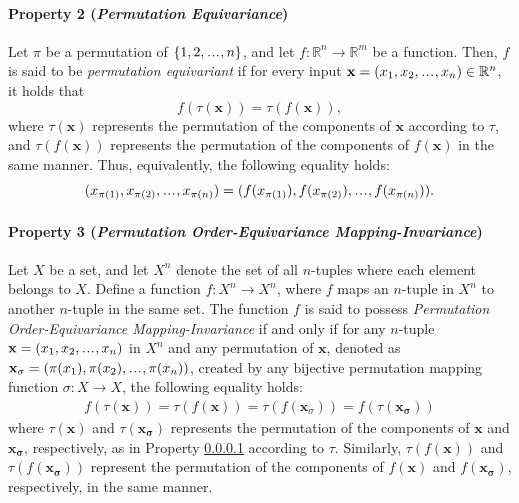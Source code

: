 \documentclass{article}
\newcommand{\poemi}{\emph{Permutation Order-Equivariance Mapping-Invariance}}
\newcommand{\permeq}{\emph{Permutation Equivariance}}
\newcommand\sdots{\makebox[1em][c]{.\hfil.\hfil.}}
\begin{document}
\paragraph{Property 2 (\permeq)}
\label{par:permutation_equivariance}
Let $\pi$ be a permutation of $\{1, 2, \sdots, n\}$, and let $f: \mathbb{R}^n \rightarrow \mathbb{R}^m$ be a function. Then, $f$ is said to be \emph{permutation equivariant}
if for every input $\mathbf{x} = (x_1, x_2, \sdots, x_n) \in \mathbb{R}^n$, it holds that
\begin{equation}
  f(\tau(\mathbf{x})) = \tau(f(\mathbf{x})),
\end{equation}
where $\tau(\mathbf{x})$ represents the permutation of the components of $\mathbf{x}$ according to $\tau$, and $\tau(f(\mathbf{x}))$
represents the permutation of the components of $f(\mathbf{x})$ in the same manner. Thus, equivalently, the following equality holds:
\begin{equation}
  (x_{\pi(1)}, x_{\pi(2)}, \sdots, x_{\pi(n)}) = (f(x_{\pi(1)}), f(x_{\pi(2)}), \sdots, f(x_{\pi(n)})).
\end{equation}

\paragraph{Property 3 (\poemi)}
Let $X$ be a set, and let $X^n$ denote the set of all $n$-tuples where each element belongs to $X$.
Define a function $f: X^n \rightarrow X^n$,
where \( f \) maps an \( n \)-tuple in \( X^n \) to another \( n \)-tuple in the same set.
The function $f$ is said to possess \emph{Permutation Order-Equivariance Mapping-Invariance} if and only if
for any $n$-tuple $\mathbf{x} = (x_1, x_2, \sdots, x_n)$ in $X^n$
and any permutation of $\mathbf{x}$, denoted as $\mathbf{x}_{\sigma} = (\pi(x_1), \pi(x_2), \sdots, \pi(x_n))$,
created by any bijective permutation mapping function $\sigma : X \rightarrow X$,
the following equality holds:
\begin{align}
  f(\tau(\mathbf{x})) = \tau(f(\mathbf{x})) =  \tau(f(\mathbf{x}_{\sigma})) = f(\tau(\mathbf{x_{\sigma}}))
\end{align}
where $\tau(\mathbf{x})$ and $\tau(\mathbf{x_{\sigma}})$ represents the permutation of the components of $\mathbf{x}$ and $\mathbf{x_{\sigma}}$, respectively,
as in Property \ref{par:permutation_equivariance} according to $\tau$. Similarly, $\tau(f(\mathbf{x}))$ and $\tau(f(\mathbf{x_{\sigma}}))$ represent the permutation
of the components of $f(\mathbf{x})$ and  $f(\mathbf{x_{\sigma}})$, respectively, in the same manner.
\end{document}

